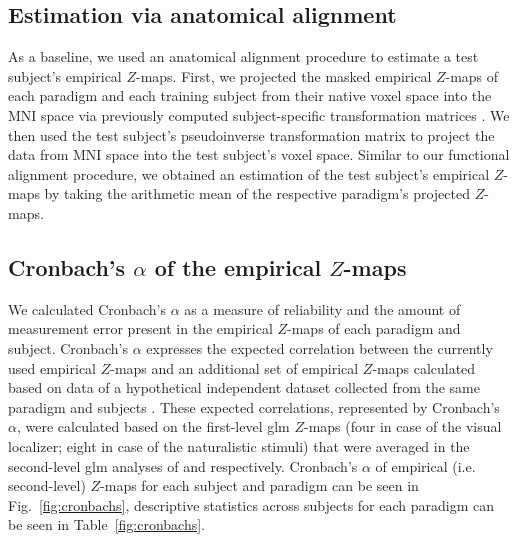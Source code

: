 \subsection{Estimation via anatomical alignment}
%
As a baseline, we used an anatomical alignment procedure to estimate a test
subject's empirical $Z$-maps.
%
First, we projected the masked empirical $Z$-maps of each paradigm and each
training subject from their native voxel space into the MNI space via previously
computed subject-specific transformation matrices
\citep[][\href{https://github.com/psychoinformatics-de/studyforrest-data-templatetransforms}{\url{github.com/psychoinformatics-de/studyforrest-data-templatetransforms}}]{hanke2014audiomovie}.
We then used the test subject's pseudoinverse transformation matrix to project
the data from MNI space into the test subject's voxel space.
Similar to our functional alignment procedure, we obtained an estimation of the
test subject's empirical $Z$-maps by taking the arithmetic mean of the
respective paradigm's projected $Z$-maps.



\subsection{Cronbach's $\alpha$ of the empirical $Z$-maps}
%
We calculated Cronbach's $\alpha$ as a measure of reliability and the amount of
measurement error \citep{cronbach1951coefficient, cortina1993coefficient}
present in the empirical $Z$-maps of each paradigm and subject.
%
Cronbach's $\alpha$ expresses the expected correlation between the currently
used empirical $Z$-maps and an additional set of empirical $Z$-maps calculated
based on data of a hypothetical independent dataset collected from the same
paradigm and subjects \citep{jiahui2020predicting, jiahui2022cross}.
%
These expected correlations, represented by Cronbach's $\alpha$, were calculated
based on the first-level \ac{glm} $Z$-maps (four in case of the visual
localizer; eight in case of the naturalistic stimuli) that were averaged in the
second-level \ac{glm} analyses of \citet{sengupta2016extension} and
\citet{haeusler2022processing} respectively.
%
Cronbach's $\alpha$ of empirical (i.e. second-level) $Z$-maps for each subject
and paradigm can be seen in Fig.~\ref{fig:cronbachs}, descriptive statistics
across subjects for each paradigm can be seen in Table~\ref{fig:cronbachs}.


